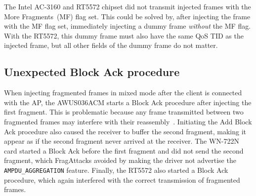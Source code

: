 \documentclass[sigconf]{acmart}
\begin{document}
The Intel AC-3160 and
RT5572 chipset did not transmit injected frames with the More Fragments~(MF) flag set.
This could be solved by, after injecting the frame with the MF flag set, immediately injecting a dummy frame \emph{without} the MF flag.
With the RT5572,
this dummy frame must also have the same QoS TID as the injected frame,
but all other fields of the dummy frame do not matter.

\subsection{Unexpected Block Ack procedure}

When injecting fragmented frames in mixed mode after the client is connected with the AP,
the AWUS036ACM starts a Block Ack procedure after injecting the first fragment. %
This is problematic because any frame transmitted between two fragmented frames may interfere with their reassembly~\cite{vanhoef-usenix2021-fragattacks}.
Initiating the Add Block Ack procedure also caused the receiver to buffer the second fragment,
making it appear as if the second fragment never arrived at the receiver.
The WN-722N card started a Block Ack before the first fragment and did not send the second fragment,
which FragAttacks avoided by making the driver not advertise the \verb|AMPDU_AGGREGATION| feature.
Finally, the RT5572 also started a Block Ack procedure, which again interfered with the correct transmission of fragmented frames.
\end{document}
